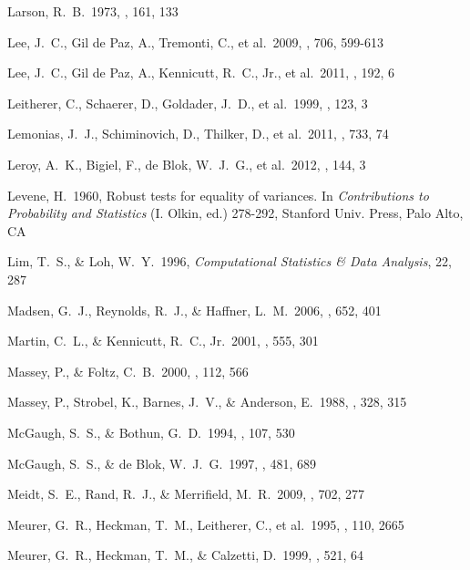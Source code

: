  Larson, R.~B.\ 1973, \mnras, 161, 133 

 Lee, J.~C., Gil de Paz, A., Tremonti, C., et al.\ 2009, \apj, 706, 599-613 


 Lee, J.~C., Gil de Paz, A., Kennicutt, R.~C., Jr., et al.\ 2011, \apjs, 192, 6 


 Leitherer, C., Schaerer, D., Goldader, J.~D., et al.\ 1999, \apjs, 123, 3 

 Lemonias, J.~J., Schiminovich, D., Thilker, D., et al.\ 2011, \apj, 733, 74  

 Leroy, A.~K., Bigiel, F., de Blok, W.~J.~G., et al.\ 2012, \aj, 144, 3 

 Levene, H.\ 1960, Robust tests for
 equality of variances.  In \emph{Contributions to Probability and
 Statistics} (I. Olkin, ed.) 278-292, Stanford Univ. Press, Palo
 Alto, CA

 Lim, T.~S., \& Loh, W.~Y.\
 1996, \emph{Computational Statistics \& Data Analysis}, 22, 287

 Madsen, G.~J., Reynolds, R.~J., \& Haffner, L.~M.\ 2006, \apj, 652, 401 


 Martin, C.~L., \& Kennicutt, R.~C., Jr.\ 2001, \apj, 555, 301 


 Massey, P., \& Foltz, C.~B.\ 2000, \pasp, 112, 566 


 Massey, P., Strobel, K., Barnes, J.~V., \& Anderson, E.\ 1988, \apj, 328, 315 


 McGaugh, S.~S., \& Bothun, G.~D.\ 1994, \aj, 107, 530 


 McGaugh, S.~S., \& de Blok, W.~J.~G.\ 1997, \apj, 481, 689 


 Meidt, S.~E., Rand, R.~J., \& Merrifield, M.~R.\ 2009, \apj, 702, 277 

 Meurer, G.~R., Heckman, T.~M., Leitherer, C., et al.\ 1995, \aj, 110, 2665 

 Meurer, G.~R., Heckman, T.~M., \& Calzetti, D.\ 1999, \apj, 521, 64 


